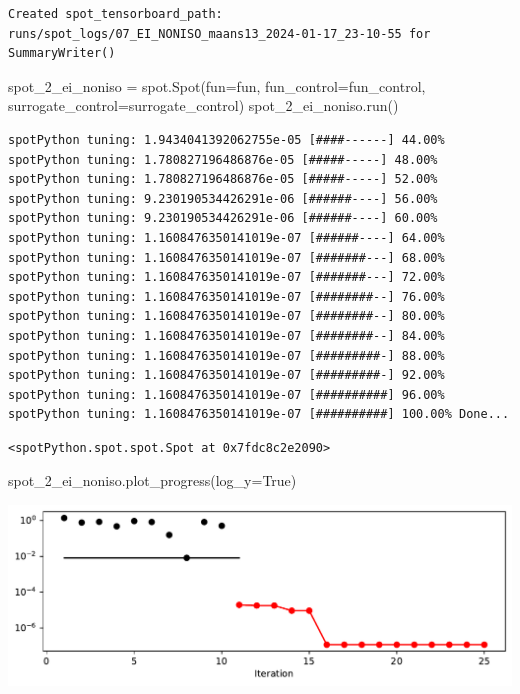 \documentclass[
  letterpaper,
  DIV=11,
  numbers=noendperiod]{scrreprt}
\newenvironment{Shaded}{\begin{snugshade}}{\end{snugshade}}
\newcommand{\NormalTok}[1]{\textcolor[rgb]{0.00,0.23,0.31}{#1}}
\newcommand{\OperatorTok}[1]{\textcolor[rgb]{0.37,0.37,0.37}{#1}}
\newcommand{\VariableTok}[1]{\textcolor[rgb]{0.07,0.07,0.07}{#1}}
\begin{document}
\begin{verbatim}
Created spot_tensorboard_path: runs/spot_logs/07_EI_NONISO_maans13_2024-01-17_23-10-55 for SummaryWriter()
\end{verbatim}

\begin{Shaded}
\begin{Highlighting}[]
\NormalTok{spot\_2\_ei\_noniso }\OperatorTok{=}\NormalTok{ spot.Spot(fun}\OperatorTok{=}\NormalTok{fun,}
\NormalTok{                   fun\_control}\OperatorTok{=}\NormalTok{fun\_control,}
\NormalTok{                   surrogate\_control}\OperatorTok{=}\NormalTok{surrogate\_control)}
\NormalTok{spot\_2\_ei\_noniso.run()}
\end{Highlighting}
\end{Shaded}

\begin{verbatim}
spotPython tuning: 1.9434041392062755e-05 [####------] 44.00% 
spotPython tuning: 1.780827196486876e-05 [#####-----] 48.00% 
spotPython tuning: 1.780827196486876e-05 [#####-----] 52.00% 
spotPython tuning: 9.230190534426291e-06 [######----] 56.00% 
spotPython tuning: 9.230190534426291e-06 [######----] 60.00% 
spotPython tuning: 1.1608476350141019e-07 [######----] 64.00% 
spotPython tuning: 1.1608476350141019e-07 [#######---] 68.00% 
spotPython tuning: 1.1608476350141019e-07 [#######---] 72.00% 
spotPython tuning: 1.1608476350141019e-07 [########--] 76.00% 
spotPython tuning: 1.1608476350141019e-07 [########--] 80.00% 
spotPython tuning: 1.1608476350141019e-07 [########--] 84.00% 
spotPython tuning: 1.1608476350141019e-07 [#########-] 88.00% 
spotPython tuning: 1.1608476350141019e-07 [#########-] 92.00% 
spotPython tuning: 1.1608476350141019e-07 [##########] 96.00% 
spotPython tuning: 1.1608476350141019e-07 [##########] 100.00% Done...
\end{verbatim}

\begin{verbatim}
<spotPython.spot.spot.Spot at 0x7fdc8c2e2090>
\end{verbatim}

\begin{Shaded}
\begin{Highlighting}[]
\NormalTok{spot\_2\_ei\_noniso.plot\_progress(log\_y}\OperatorTok{=}\VariableTok{True}\NormalTok{)}
\end{Highlighting}
\end{Shaded}

\includegraphics{012_num_spot_ei_files/figure-pdf/cell-14-output-1.pdf}
\end{document}
